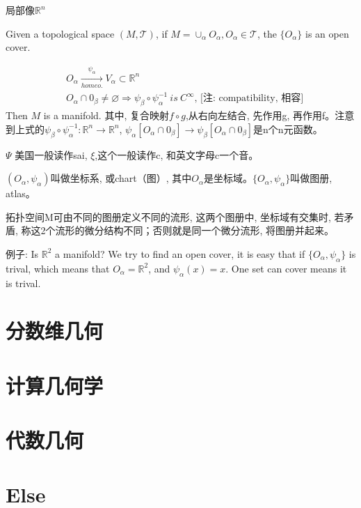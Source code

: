 \documentclass[UTF8]{../09-Mathematics}
\begin{document}
局部像$\mathbb R ^n$


Given a topological space $(M, \mathscr T)$, if $M = \cup _ \alpha O_\alpha , O_\alpha \in \mathscr T$, the $\{ O_\alpha\}$ is an open cover.

\begin{displaymath}
  \begin{split}
    & O _\alpha \xrightarrow[homeo.]{\psi_\alpha } V_\alpha \subset \mathbb R^n \\
    & O_\alpha \cap 0_\beta \neq \varnothing \Longrightarrow \psi_\beta \circ \psi_\alpha ^ {-1} \ is \ C^ \infty \mbox{, [注: compatibility, 相容]}
  \end{split}
\end{displaymath}
Then $M$ is a manifold. 其中, 复合映射$f \circ g$,从右向左结合, 先作用g, 再作用f。注意到上式的$\psi_\beta \circ \psi_\alpha ^ {-1}: \mathbb R^n \to \mathbb R^n$, $\psi_\alpha[O_\alpha \cap 0_\beta] \to \psi_\beta[O_\alpha \cap 0_\beta] $是n个n元函数。


$\Psi$ 美国一般读作sai, $\xi$,这个一般读作c,  和英文字母c一个音。

$( O_\alpha, \psi_\alpha)$叫做坐标系, 或chart（图）, 其中$O_\alpha$是坐标域。$\{ O_\alpha, \psi_\alpha \}$叫做图册, atlas。

拓扑空间M可由不同的图册定义不同的流形, 这两个图册中, 坐标域有交集时, 若矛盾, 称这2个流形的微分结构不同；否则就是同一个微分流形, 将图册并起来。

例子: Is $\mathbb R^2$ a manifold? We try to find an open cover, it is easy that  if $\{ O_\alpha, \psi_\alpha \}$ is trival, which means that $O_\alpha = \mathbb R^2$, and $\psi_\alpha (x) = x $. One set can cover means it is trival.



\chapter{分数维几何}
\chapter{计算几何学}
\chapter{代数几何}



\chapter{Else}
\end{document}
